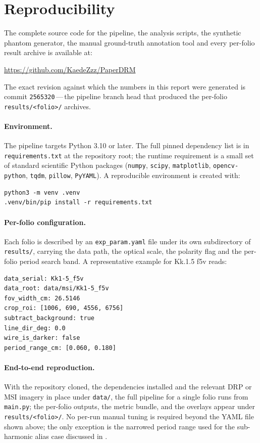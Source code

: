 \section{Reproducibility}
\label{app:repro}

The complete source code for the pipeline, the analysis scripts, the
synthetic phantom generator, the manual ground-truth annotation tool
and every per-folio result archive is available at:
\begin{center}
\url{https://github.com/KaedeZzz/PaperDRM}
\end{center}
The exact revision against which the numbers in this report were
generated is commit \texttt{2565320}\,---\,the pipeline branch head
that produced the per-folio \texttt{results/<folio>/} archives.

\paragraph{Environment.}
The pipeline targets Python 3.10 or later. The full pinned dependency
list is in \texttt{requirements.txt} at the repository root; the
runtime requirement is a small set of standard scientific Python
packages (\texttt{numpy}, \texttt{scipy}, \texttt{matplotlib},
\texttt{opencv-python}, \texttt{tqdm}, \texttt{pillow},
\texttt{PyYAML}). A reproducible environment is created with:
\begin{verbatim}
python3 -m venv .venv
.venv/bin/pip install -r requirements.txt
\end{verbatim}

\paragraph{Per-folio configuration.}
Each folio is described by an \texttt{exp\_param.yaml} file
under its own subdirectory of \texttt{results/}, carrying the
data path, the optical scale, the polarity flag and the per-folio
period search band. A representative example for Kk.1.5 f5v reads:
\begin{verbatim}
data_serial: Kk1-5_f5v
data_root: data/msi/Kk1-5_f5v
fov_width_cm: 26.5146
crop_roi: [1006, 690, 4556, 6756]
subtract_background: true
line_dir_deg: 0.0
wire_is_darker: false
period_range_cm: [0.060, 0.180]
\end{verbatim}

\paragraph{End-to-end reproduction.}
With the repository cloned, the dependencies installed and the
relevant DRP or MSI imagery in place under \texttt{data/}, the full
pipeline for a single folio runs from \texttt{main.py}; the per-folio
outputs, the metric bundle, and the overlays appear under
\texttt{results/<folio>/}. No per-run manual tuning is required beyond
the YAML file shown above; the only exception is the narrowed period
range used for the sub-harmonic alias case discussed in
.
